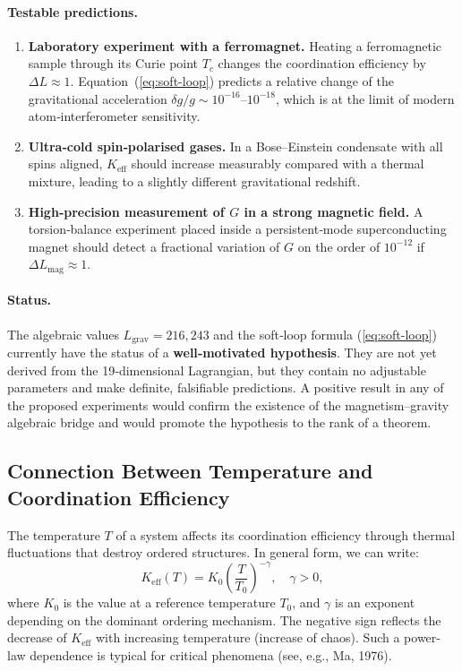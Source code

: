 \documentclass[12pt]{article}
\theoremstyle{remark}
\newcommand{\Keff}{K_{\mathrm{eff}}}
\begin{document}
	\paragraph{Testable predictions.}
	\begin{enumerate}
		\item \textbf{Laboratory experiment with a ferromagnet.}
		Heating a ferromagnetic sample through its Curie point $T_c$ changes the
		coordination efficiency by $\Delta L \approx 1$.  
		Equation~(\ref{eq:soft-loop}) predicts a relative change of the gravitational
		acceleration $\delta g / g \sim 10^{-16}$–$10^{-18}$, which is at the limit of
		modern atom‑interferometer sensitivity.
		\item \textbf{Ultra‑cold spin‑polarised gases.}
		In a Bose–Einstein condensate with all spins aligned, $K_{\mathrm{eff}}$ should
		increase measurably compared with a thermal mixture, leading to a slightly
		different gravitational redshift.
		\item \textbf{High‑precision measurement of $G$ in a strong magnetic field.}
		A torsion‑balance experiment placed inside a persistent‑mode superconducting
		magnet should detect a fractional variation of $G$ on the order of $10^{-12}$
		if $\Delta L_{\mathrm{mag}} \approx 1$.
	\end{enumerate}
	
	\paragraph{Status.}
	The algebraic values $L_{\mathrm{grav}} = 216, 243$ and the soft‑loop formula
	(\ref{eq:soft-loop}) currently have the status of a \textbf{well‑motivated hypothesis}.
	They are not yet derived from the 19‑dimensional Lagrangian, but they contain no
	adjustable parameters and make definite, falsifiable predictions.
	A positive result in any of the proposed experiments would confirm the existence
	of the magnetism–gravity algebraic bridge and would promote the hypothesis to the
	rank of a theorem.
	
	\subsection{Connection Between Temperature and Coordination Efficiency}
	\label{subsec:temp-keff}
	
	The temperature $T$ of a system affects its coordination efficiency through thermal fluctuations that destroy ordered structures. In general form, we can write:
	\begin{equation}
		\Keff(T) = K_0 \left( \frac{T}{T_0} \right)^{-\gamma}, \quad \gamma > 0,
		\label{eq:keff-temp}
	\end{equation}
	where $K_0$ is the value at a reference temperature $T_0$, and $\gamma$ is an exponent depending on the dominant ordering mechanism. The negative sign reflects the decrease of $\Keff$ with increasing temperature (increase of chaos). Such a power-law dependence is typical for critical phenomena (see, e.g., Ma, 1976).
	
\end{document}
